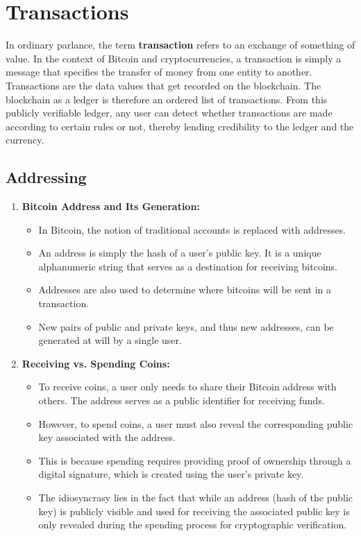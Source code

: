 \section{Transactions}
In ordinary parlance, the term \textbf{transaction} refers to an exchange of something of value. In the context of Bitcoin and cryptocurrencies, a transaction is simply a message that specifies the transfer of money from one entity to another. Transactions are the data values that get recorded on the blockchain. The blockchain as a ledger is therefore an ordered list of transactions. From this publicly verifiable ledger, any user can detect whether transactions are made according to certain rules or not, thereby lending credibility to the ledger and the currency.
\subsection{Addressing}
\begin{enumerate}
    \item \textbf{Bitcoin Address and Its Generation:}
    \begin{itemize}
        \item In Bitcoin, the notion of traditional accounts is replaced with addresses.
        \item An address is simply the hash of a user's public key. It is a unique alphanumeric string that serves as a destination for receiving bitcoins.
        \item Addresses are also used to determine where bitcoins will be sent in a transaction.
        \item New pairs of public and private keys, and thus new addresses, can be generated at will by a single user.
    \end{itemize}
    \item \textbf{Receiving vs. Spending Coins:}
    \begin{itemize}
    \item To receive coins, a user only needs to share their Bitcoin address with others. The address serves as a public identifier for receiving funds.
    \item However, to spend coins, a user must also reveal the corresponding public key associated with the address.
    \item This is because spending requires providing proof of ownership through a digital signature, which is created using the user's private key.
    \item The idiosyncrasy lies in the fact that while an address (hash of the public key) is publicly visible and used for receiving the associated public key is only revealed during the spending process for cryptographic verification.
    \end{itemize}
\end{enumerate}
